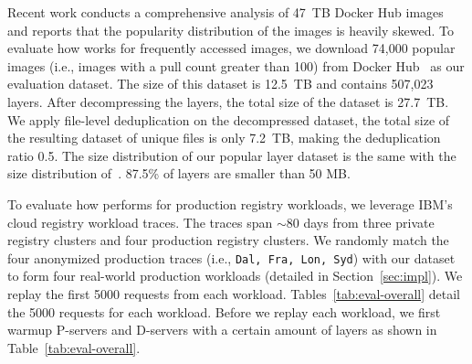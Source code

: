 Recent work \cite{analysisdockergithub} conducts a comprehensive analysis of 47~TB Docker Hub images and reports that the popularity distribution of the images is heavily skewed.
To evaluate how \sysname works for frequently accessed images, 
we download 74,000 popular images (i.e., images with a pull count greater than 100) from Docker Hub~\cite{docker-hub} as our evaluation dataset. 
The size of this dataset is 12.5~TB and contains 507,023 layers. 
After decompressing the layers, the total size of the dataset is 27.7~TB.
We apply file-level deduplication on the decompressed dataset, 
the total size of the resulting dataset of unique files is only 7.2~TB, 
making the deduplication ratio 0.5.
The size distribution of our popular layer dataset is the same with the size distribution of~\cite{analysisdockergithub}.
87.5\% of layers are smaller than 50 MB.
  
To evaluate how \sysname performs for production registry workloads, 
we leverage IBM's cloud registry workload traces\cite{dockerworkload}. 
The traces span $\sim$80 days from three private registry clusters and 
four production registry clusters. 
We randomly match the four anonymized production traces (i.e., \texttt{Dal, Fra, Lon, Syd}) 
with our dataset to form four real-world production workloads (detailed in Section~\ref{sec:impl}). 
We replay the first 5000 requests from each workload.
Tables~\ref{tab:eval-overall} detail the 5000 requests for each workload.
Before we replay each workload, 
we first warmup P-servers and D-servers with a certain amount of layers 
as shown in Table~\ref{tab:eval-overall}.




%
%